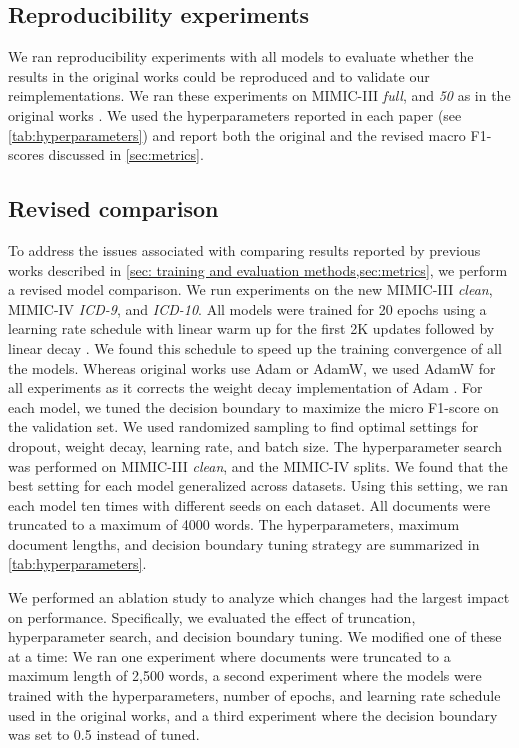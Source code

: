 {\subsection{Reproducibility experiments}

We ran reproducibility experiments with all models to evaluate whether the results in the original works could be reproduced and to validate our reimplementations. We ran these experiments on MIMIC-III \textit{full}, and \textit{50} as in the original works \parencite{mullenbachExplainablePredictionMedical2018,liICDCodingClinical2020,vuLabelAttentionModel2020,huangPLMICDAutomaticICD2022}. We used the hyperparameters reported in each paper (see \cref{tab:hyperparameters}) and report both the original and the revised macro F1-scores discussed in \cref{sec:metrics}.

\subsection{Revised comparison}
To address the issues associated with comparing results reported by previous works described in \cref{sec: training and evaluation methods,sec:metrics}, we perform a revised model comparison. We run experiments on the new MIMIC-III \textit{clean}, MIMIC-IV \textit{ICD-9}, and \textit{ICD-10}.
All models were trained for 20 epochs using a learning rate schedule with linear warm up for the first 2K updates followed by linear decay \parencite{huangPLMICDAutomaticICD2022}. We found this schedule to speed up the training convergence of all the models.
Whereas original works use Adam or AdamW, we used AdamW for all experiments as it corrects the weight decay implementation of Adam \parencite{kingmaAdamMethodStochastic2017, loshchilovDecoupledWeightDecay2022}. For each model, we tuned the decision boundary to maximize the micro F1-score on the validation set. We used randomized sampling to find optimal settings for dropout, weight decay, learning rate, and batch size. The hyperparameter search was performed on MIMIC-III \textit{clean}, and the MIMIC-IV splits. We found that the best setting for each model generalized across datasets. Using this setting, we ran each model ten times with different seeds on each dataset. All documents were truncated to a maximum of 4000 words. The hyperparameters, maximum document lengths, and decision boundary tuning strategy are summarized in \cref{tab:hyperparameters}. 

We performed an ablation study to analyze which changes had the largest impact on performance. 
Specifically, we evaluated the effect of truncation, hyperparameter search, and decision boundary tuning. We modified one of these at a time: We ran one experiment where documents were truncated to a maximum length of 2,500 words, a second experiment where the models were trained with the hyperparameters, number of epochs, and learning rate schedule used in the original works, and a third experiment where the decision boundary was set to 0.5 instead of tuned.

}
